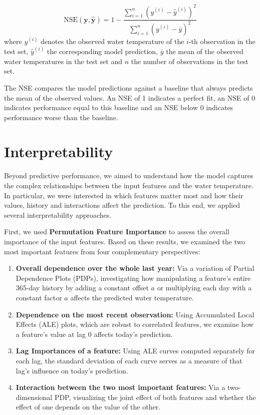 \documentclass[
]{krantz}
\providecommand{\tightlist}{%
  \setlength{\itemsep}{0pt}\setlength{\parskip}{0pt}}
\begin{document}
\[
\mathrm{NSE}(\boldsymbol y, \hat{\boldsymbol y}) = 1 - \frac{\sum_{i = 1}^n\left(y^{(i)} - \hat y^{(i)}\right)^2}{\sum_{i=1}^n \left(y^{(i)} - \bar{y}\right)^2}
\]
where \(y^{(i)}\) denotes the observed water temperature of the \(i\)-th observation in the test set, \(\hat{y}^{(i)}\) the corresponding model prediction, \(\bar{y}\) the mean of the observed water temperatures in the test set and \(n\) the number of observations in the test set.

The NSE compares the model predictions against a baseline that always predicts the mean of the observed values. An NSE of 1 indicates a perfect fit, an NSE of 0 indicates performance equal to this baseline and an NSE below 0 indicates performance worse than the baseline.

\newpage

\section{Interpretability}\label{interpretability}

Beyond predictive performance, we aimed to understand how the model captures the complex relationships between the input features and the water temperature. In particular, we were interested in which features matter most and how their values, history and interactions affect the prediction. To this end, we applied several interpretability approaches.

First, we used \textbf{Permutation Feature Importance} to assess the overall importance of the input features. Based on these results, we examined the two most important features from four complementary perspectives:

\begin{enumerate}
\def\labelenumi{\arabic{enumi}.}
\tightlist
\item
  \textbf{Overall dependence over the whole last year:}
  Via a variation of Partial Dependence Plots (PDPs), investigating how manipulating a feature's entire 365-day history by adding a constant offset \(a\) or multiplying each day with a constant factor \(a\) affects the predicted water temperature.
\item
  \textbf{Dependence on the most recent observation:}
  Using Accumulated Local Effects (ALE) plots, which are robust to correlated features, we examine how a feature's value at lag 0 affects today's prediction.
\item
  \textbf{Lag Importances of a feature:}
  Using ALE curves computed separately for each lag, the standard deviation of each curve serves as a measure of that lag's influence on today's prediction.
\item
  \textbf{Interaction between the two most important features:}
  Via a two-dimensional PDP, visualizing the joint effect of both features and whether the effect of one depends on the value of the other.
\end{enumerate}
\end{document}
